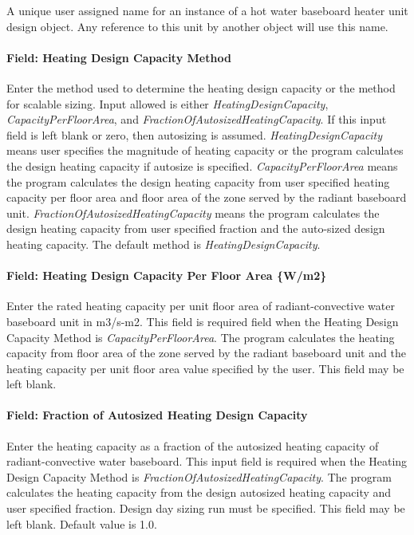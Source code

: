 A unique user assigned name for an instance of a hot water baseboard heater unit design object. Any reference to this unit by another object will use this name.

\paragraph{Field: Heating Design Capacity Method}\label{field-heating-design-capacity-method-000}

Enter the method used to determine the heating design capacity or the method for scalable sizing. Input allowed is either \emph{HeatingDesignCapacity}, \emph{CapacityPerFloorArea}, and \emph{FractionOfAutosizedHeatingCapacity}. If this input field is left blank or zero, then autosizing is assumed. \emph{HeatingDesignCapacity} means user specifies the magnitude of heating capacity or the program calculates the design heating capacity if autosize is specified. \emph{CapacityPerFloorArea} means the program calculates the design heating capacity from user specified heating capacity per floor area and floor area of the zone served by the radiant baseboard unit. \emph{FractionOfAutosizedHeatingCapacity} means the program calculates the design heating capacity from user specified fraction and the auto-sized design heating capacity. The default method is \emph{HeatingDesignCapacity}.

\paragraph{Field: Heating Design Capacity Per Floor Area \{W/m2\}}\label{field-heating-design-capacity-per-floor-area-wm2-000}

Enter the rated heating capacity per unit floor area of radiant-convective water baseboard unit in m3/s-m2. This field is required field when the Heating Design Capacity Method is \emph{CapacityPerFloorArea}. The program calculates the heating capacity from floor area of the zone served by the radiant baseboard unit and the heating capacity per unit floor area value specified by the user. This field may be left blank.

\paragraph{Field: Fraction of Autosized Heating Design Capacity}\label{field-fraction-of-autosized-heating-design-capacity-000}

Enter the heating capacity as a fraction of the autosized heating capacity of radiant-convective water baseboard. This input field is required when the Heating Design Capacity Method is \emph{FractionOfAutosizedHeatingCapacity}. The program calculates the heating capacity from the design autosized heating capacity and user specified fraction. Design day sizing run must be specified. This field may be left blank. Default value is 1.0.

